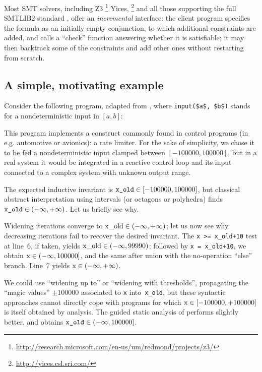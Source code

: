\documentclass[preprint]{sigplanconf}
\begin{document}
Most SMT solvers, including Z3%
\footnote{\url{http://research.microsoft.com/en-us/um/redmond/projects/z3/}}
Yices,%
\footnote{\url{http://yices.csl.sri.com/}}
and all those supporting the full SMTLIB2 standard \cite{BarST-SMTLIB},
offer an \emph{incremental} interface: the client program specifies the formula as an initially empty conjunction, to which additional constraints are added, and calls a ``check'' function answering whether it is satisfiable; 
it may then backtrack some of the constraints and add other ones without restarting from scratch.

\subsection{A simple, motivating example}
\label{subsec:rate_lim}
Consider the following program, adapted from \cite{Monniaux_Gonnord_SAS11}, where \lstinline|input($a$, $b$)| stands for a nondeterministic input in $[a,b]$:

This program implements a construct commonly found in control programs (in e.g. automotive or avionics): a rate limiter. For the sake of simplicity, we chose it to be fed a nondeterministic input clamped between $[-100000,100000]$, but in a real system it would be integrated in a reactive control loop and its input connected to a complex system with unknown output range.

The expected inductive invariant is $\verb|x_old| \in [-100000,100000]$, but classical abstract interpretation using intervals (or octagons or polyhedra) finds $\verb|x_old| \in (-\infty,+\infty)$. %
Let us briefly see why.

Widening iterations converge to $\lstinline|x_old| \in (-\infty,+\infty)$; let us now see why decreasing iterations fail to recover the desired invariant. %
The \lstinline|x >= x_old+10| test at line~6, if taken, yields $\lstinline|x_old| \in (-\infty,99990)$; followed by \lstinline|x = x_old+10|, we obtain $\lstinline|x| \in (-\infty,\allowbreak 100000]$, and the same after union with the no-operation ``else'' branch. Line~7 yields $\lstinline|x| \in (-\infty,+\infty)$.

We could use ``widening up to'' or ``widening with thresholds'', propagating the ``magic values'' $\pm 100000$ associated to \lstinline|x| into~\lstinline|x_old|, but these syntactic approaches cannot directly cope with programs for which $\lstinline|x|  \in [-100000,+100000]$ is itself obtained by analysis.
The guided static analysis of \citet{DBLP:conf/sas/GopanR07} performs slightly better, and obtains $\verb|x_old| \in (-\infty,100000]$.
\end{document}
